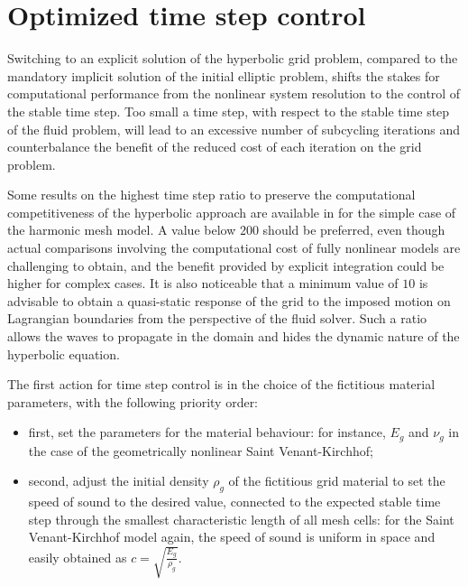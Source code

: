 \section{Optimized time step control}

Switching to an explicit solution of the hyperbolic grid problem, compared to the mandatory implicit solution of the initial elliptic problem, shifts the stakes for computational performance from the nonlinear system resolution to the control of the stable time step. Too small a time step, with respect to the stable time step of the fluid problem, will lead to an excessive number of subcycling iterations and counterbalance the benefit of the reduced cost of each iteration on the grid problem.

Some results on the highest time step ratio to preserve the computational competitiveness of the hyperbolic approach are available in \cite{leprevost_computationally_2023} for the simple case of the harmonic mesh model. A value below $200$ should be preferred, even though actual comparisons involving the computational cost of fully nonlinear models are challenging to obtain, and the benefit provided by explicit integration could be higher for complex cases. It is also noticeable that a minimum value of $10$ is advisable to obtain a quasi-static response of the grid to the imposed motion on Lagrangian boundaries from the perspective of the fluid solver. Such a ratio allows the waves to propagate in the domain and hides the dynamic nature of the hyperbolic equation.

The first action for time step control is in the choice of the fictitious material parameters, with the following priority order:

\begin{itemize}
    \item[$-$] first, set the parameters for the material behaviour: for instance, $E_g$ and $\nu_g$ in the case of the geometrically nonlinear Saint Venant-Kirchhof;
    \item[$-$] second, adjust the initial density $\rho_g$ of the fictitious grid material to set the speed of sound to the desired value, connected to the expected stable time step through the smallest characteristic length of all mesh cells: for the Saint Venant-Kirchhof model again, the speed of sound is uniform in space and easily obtained as $c = \sqrt{\frac{E_g}{\rho_g}}$.
\end{itemize}


